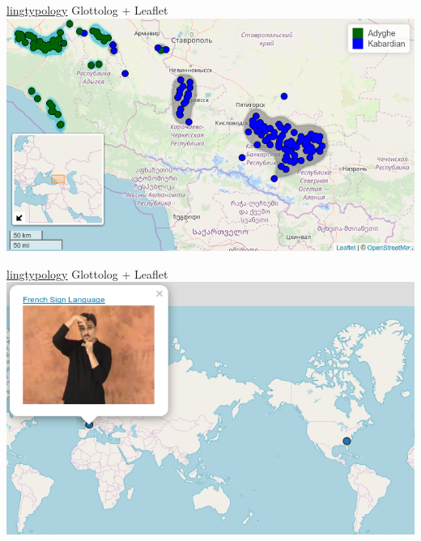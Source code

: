 \documentclass[13pt, t]{beamer}
\begin{document}
\begin{frame}{\href{https://ropensci.github.io/lingtypology/}{lingtypology}}
\alert{\large Glottolog + Leaflet}\\
\vfill
\includegraphics[width=\linewidth]{images/05-density}
\end{frame}

\begin{frame}{\href{https://ropensci.github.io/lingtypology/}{lingtypology}}
\alert{\large Glottolog + Leaflet}\\
\vfill
\includegraphics[width=\linewidth]{images/06-sign}
\end{frame}
\end{document}
